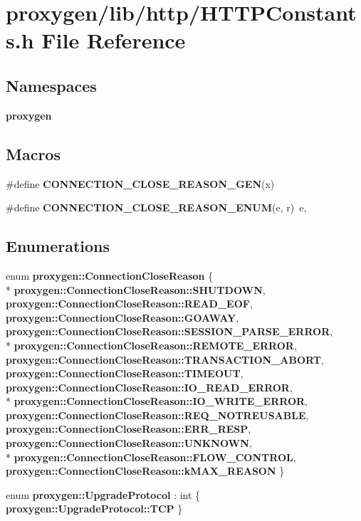 \section{proxygen/lib/http/\+H\+T\+T\+P\+Constants.h File Reference}
\label{HTTPConstants_8h}
\subsection*{Namespaces}
\begin{DoxyCompactItemize}
\item 
 {\bf proxygen}
\end{DoxyCompactItemize}
\subsection*{Macros}
\begin{DoxyCompactItemize}
\item 
\#define {\bf C\+O\+N\+N\+E\+C\+T\+I\+O\+N\+\_\+\+C\+L\+O\+S\+E\+\_\+\+R\+E\+A\+S\+O\+N\+\_\+\+G\+EN}(x)
\item 
\#define {\bf C\+O\+N\+N\+E\+C\+T\+I\+O\+N\+\_\+\+C\+L\+O\+S\+E\+\_\+\+R\+E\+A\+S\+O\+N\+\_\+\+E\+N\+UM}(e,  r)~e,
\end{DoxyCompactItemize}
\subsection*{Enumerations}
\begin{DoxyCompactItemize}
\item 
enum {\bf proxygen\+::\+Connection\+Close\+Reason} \{ \\*
{\bf proxygen\+::\+Connection\+Close\+Reason\+::\+S\+H\+U\+T\+D\+O\+WN}, 
{\bf proxygen\+::\+Connection\+Close\+Reason\+::\+R\+E\+A\+D\+\_\+\+E\+OF}, 
{\bf proxygen\+::\+Connection\+Close\+Reason\+::\+G\+O\+A\+W\+AY}, 
{\bf proxygen\+::\+Connection\+Close\+Reason\+::\+S\+E\+S\+S\+I\+O\+N\+\_\+\+P\+A\+R\+S\+E\+\_\+\+E\+R\+R\+OR}, 
\\*
{\bf proxygen\+::\+Connection\+Close\+Reason\+::\+R\+E\+M\+O\+T\+E\+\_\+\+E\+R\+R\+OR}, 
{\bf proxygen\+::\+Connection\+Close\+Reason\+::\+T\+R\+A\+N\+S\+A\+C\+T\+I\+O\+N\+\_\+\+A\+B\+O\+RT}, 
{\bf proxygen\+::\+Connection\+Close\+Reason\+::\+T\+I\+M\+E\+O\+UT}, 
{\bf proxygen\+::\+Connection\+Close\+Reason\+::\+I\+O\+\_\+\+R\+E\+A\+D\+\_\+\+E\+R\+R\+OR}, 
\\*
{\bf proxygen\+::\+Connection\+Close\+Reason\+::\+I\+O\+\_\+\+W\+R\+I\+T\+E\+\_\+\+E\+R\+R\+OR}, 
{\bf proxygen\+::\+Connection\+Close\+Reason\+::\+R\+E\+Q\+\_\+\+N\+O\+T\+R\+E\+U\+S\+A\+B\+LE}, 
{\bf proxygen\+::\+Connection\+Close\+Reason\+::\+E\+R\+R\+\_\+\+R\+E\+SP}, 
{\bf proxygen\+::\+Connection\+Close\+Reason\+::\+U\+N\+K\+N\+O\+WN}, 
\\*
{\bf proxygen\+::\+Connection\+Close\+Reason\+::\+F\+L\+O\+W\+\_\+\+C\+O\+N\+T\+R\+OL}, 
{\bf proxygen\+::\+Connection\+Close\+Reason\+::k\+M\+A\+X\+\_\+\+R\+E\+A\+S\+ON}
 \}
\item 
enum {\bf proxygen\+::\+Upgrade\+Protocol} \+: int \{ {\bf proxygen\+::\+Upgrade\+Protocol\+::\+T\+CP}
 \}
\end{DoxyCompactItemize}
